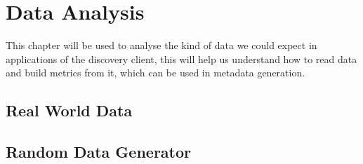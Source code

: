 \chapter{Data Analysis}\label{ch:dataanalysis}
This chapter will be used to analyse the kind of data we could expect in applications of the discovery client,
this will help us understand how to read data and build metrics from it, which can be used in metadata generation.


\section{Real World Data}



\section{Random Data Generator}
